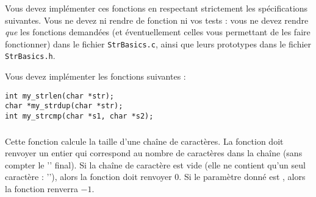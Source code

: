 

\vspace*{0.7cm}

\noindent {}

\bigskip

\noindent Vous devez implémenter ces fonctions en respectant strictement les spécifications suivantes.
Vous ne devez ni rendre de fonction  ni vos tests : vous ne devez rendre \textit{que} les fonctions demandées (et éventuellement celles vous permettant de les faire fonctionner) dans le fichier \texttt{StrBasics.c}, ainsi que leurs prototypes dans le fichier \texttt{StrBasics.h}.

\bigskip


\noindent Vous devez implémenter les fonctions suivantes :

\bigskip

\lstset{language=C}
\begin{lstlisting}[frame=single]
int my_strlen(char *str);
char *my_strdup(char *str);
int my_strcmp(char *s1, char *s2);
\end{lstlisting}


\subsubsection*{}

\noindent Cette fonction calcule la taille d'une chaîne de caractères.
La fonction doit renvoyer un entier qui correspond au nombre de caractères dans la chaîne (sans compter le '' final).
Si la chaîne de caractère est vide (elle ne contient qu'un seul caractère : ''), alors la fonction doit renvoyer $ 0 $.
Si le paramètre donné est , alors la fonction renverra $ -1 $.


